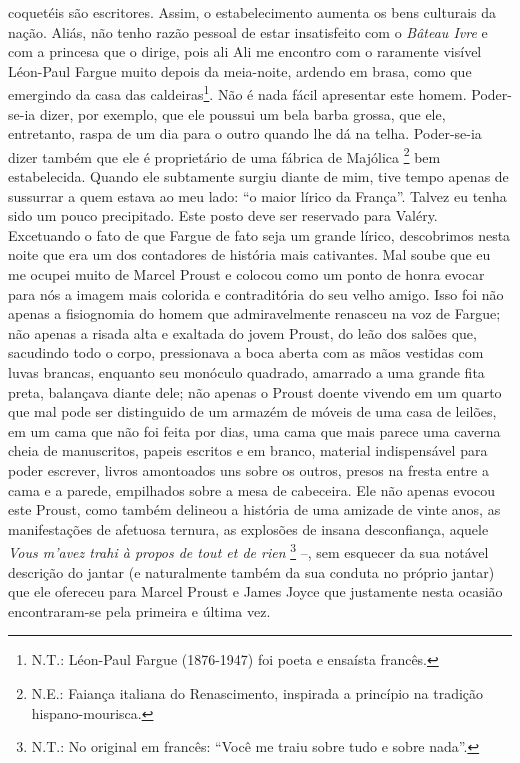 coquetéis são escritores. Assim, o estabelecimento aumenta os bens
culturais da nação. Aliás, não tenho razão pessoal de estar insatisfeito
com o \emph{Bâteau Ivre} e com a princesa que o dirige, pois ali Ali me
encontro com o raramente visível Léon-Paul Fargue muito depois da
meia-noite, ardendo em brasa, como que emergindo da casa das
caldeiras\footnote{N.T.: Léon-Paul Fargue (1876-1947) foi poeta e
  ensaísta francês.}. Não é nada fácil apresentar este homem.
Poder-se-ia dizer, por exemplo, que ele poussui um bela barba grossa,
que ele, entretanto, raspa de um dia para o outro quando lhe dá na
telha. Poder-se-ia dizer também que ele é proprietário de uma fábrica de
Majólica \footnote{N.E.: Faiança italiana do Renascimento, inspirada a
  princípio na tradição hispano-mourisca.} bem estabelecida. Quando ele
subtamente surgiu diante de mim, tive tempo apenas de sussurrar a quem
estava ao meu lado: ``o maior lírico da França''. Talvez eu tenha sido
um pouco precipitado. Este posto deve ser reservado para Valéry.
Excetuando o fato de que Fargue de fato seja um grande lírico,
descobrimos nesta noite que era um dos contadores de história mais
cativantes. Mal soube que eu me ocupei muito de Marcel Proust e colocou
como um ponto de honra evocar para nós a imagem mais colorida e
contraditória do seu velho amigo. Isso foi não apenas a fisiognomia do
homem que admiravelmente renasceu na voz de Fargue; não apenas a risada
alta e exaltada do jovem Proust, do leão dos salões que, sacudindo todo
o corpo, pressionava a boca aberta com as mãos vestidas com luvas
brancas, enquanto seu monóculo quadrado, amarrado a uma grande fita
preta, balançava diante dele; não apenas o Proust doente vivendo em um
quarto que mal pode ser distinguido de um armazém de móveis de uma casa
de leilões, em um cama que não foi feita por dias, uma cama que mais
parece uma caverna cheia de manuscritos, papeis escritos e em branco,
material indispensável para poder escrever, livros amontoados uns sobre
os outros, presos na fresta entre a cama e a parede, empilhados sobre a
mesa de cabeceira. Ele não apenas evocou este Proust, como também
delineou a história de uma amizade de vinte anos, as manifestações de
afetuosa ternura, as explosões de insana desconfiança, aquele \emph{Vous
m'avez trahi à propos de tout et de rien} \footnote{N.T.: No original em
  francês: ``Você me traiu sobre tudo e sobre nada''.} --, sem esquecer
da sua notável descrição do jantar (e naturalmente também da sua conduta
no próprio jantar) que ele ofereceu para Marcel Proust e James Joyce que
justamente nesta ocasião encontraram-se pela primeira e última vez.
